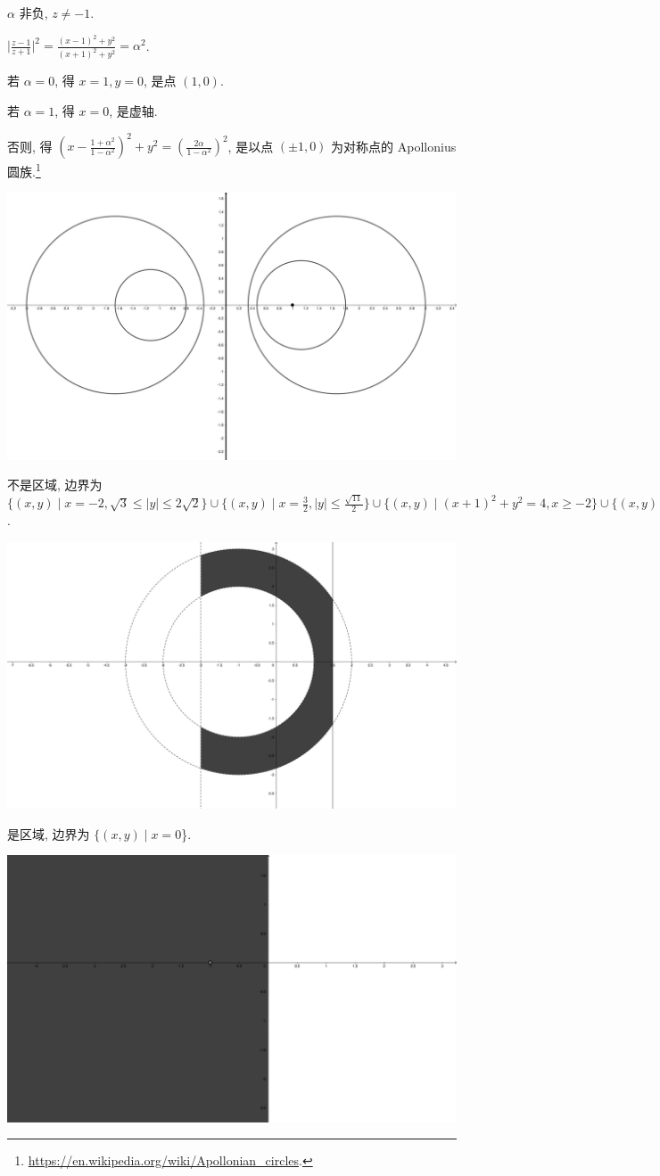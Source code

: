 \documentclass{homework}
\begin{document}
\(\alpha\) 非负, \(z\neq-1\).

\(\lvert\frac{z-1}{z+1}\rvert^2=\frac{(x-1)^2+y^2}{(x+1)^2+y^2}=\alpha^2\).

若 \(\alpha=0\), 得 \(x=1, y=0\), 是点 \((1, 0)\).

若 \(\alpha=1\), 得 \(x=0\), 是虚轴.

否则, 得 \(\left(x-\frac{1+\alpha^2}{1-\alpha^2}\right)^2+y^2=\left(\frac{2\alpha}{1-\alpha^2}\right)^2\), 是以点 $(\pm1, 0)$ 为对称点的 Apollonius 圆族.\footnote{\url{https://en.wikipedia.org/wiki/Apollonian_circles}.}

\begin{center}
  \includegraphics[width=.72\columnwidth]{figure/18.5.pdf}
\end{center}

不是区域, 边界为 \(\{(x, y)\mid x=-2, \sqrt{3}\leq|y|\leq 2\sqrt{2}\}\cup\{(x, y)\mid x=\frac{3}{2}, |y|\leq\frac{\sqrt{11}}{2}\}\cup\{(x, y)\mid(x+1)^2+y^2=4, x\geq-2\}\cup\{(x, y)\mid(x+1)^2+y^2=9, -2\leq x\leq\frac{3}{2}\}\).

\begin{center}
  \includegraphics[width=.72\columnwidth]{figure/19.6.pdf}
\end{center}

是区域, 边界为 \(\{(x, y)\mid x=0\)\}.
\begin{center}
  \includegraphics[width=.72\columnwidth]{figure/19.10.pdf}
\end{center}
\end{document}
